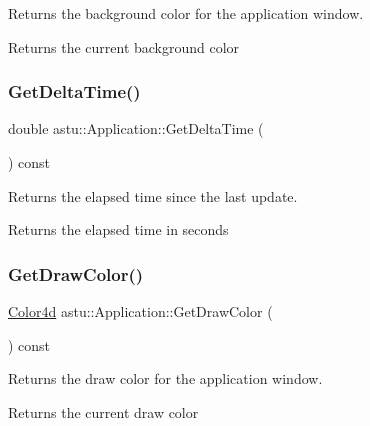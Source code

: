 Returns the background color for the application window.

\begin{DoxyReturn}{Returns}
the current background color 
\end{DoxyReturn}
\mbox{\label{classastu_1_1Application_a54815b8eb1210d2a4da6f3f439741a4d}} 
\subsubsection{\texorpdfstring{Get\+Delta\+Time()}{GetDeltaTime()}}
{\footnotesize\ttfamily double astu\+::\+Application\+::\+Get\+Delta\+Time (\begin{DoxyParamCaption}{ }\end{DoxyParamCaption}) const}

Returns the elapsed time since the last update.

\begin{DoxyReturn}{Returns}
the elapsed time in seconds 
\end{DoxyReturn}
\mbox{\label{classastu_1_1Application_a0b019c1dc5797d4ee5e604ed5cd831ed}} 
\subsubsection{\texorpdfstring{Get\+Draw\+Color()}{GetDrawColor()}}
{\footnotesize\ttfamily \hyperlink{classastu_1_1Color}{Color4d} astu\+::\+Application\+::\+Get\+Draw\+Color (\begin{DoxyParamCaption}{ }\end{DoxyParamCaption}) const}

Returns the draw color for the application window.

\begin{DoxyReturn}{Returns}
the current draw color 
\end{DoxyReturn}
\mbox{\label{classastu_1_1Application_a500d7e7a9c0100b8a4e1df2f80f85da9}} 
